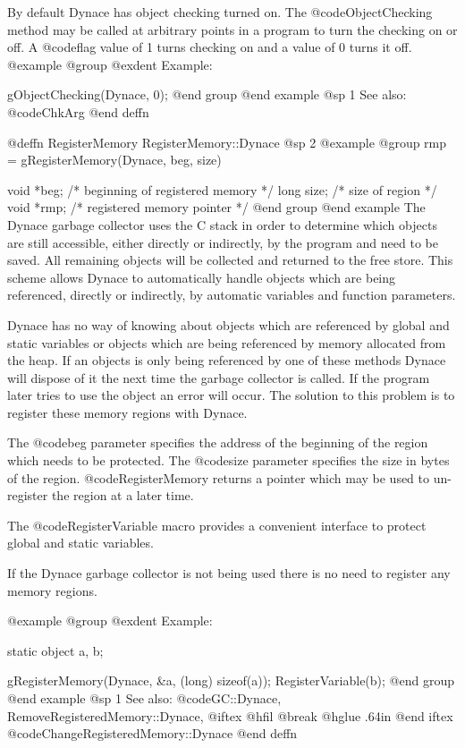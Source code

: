 By default Dynace has object checking turned on.  The @code{ObjectChecking}
method may be called at arbitrary points in a program to turn the checking
on or off.  A @code{flag} value of 1 turns checking on and a value of 0
turns it off.
@example
@group
@exdent Example:

gObjectChecking(Dynace, 0);
@end group
@end example
@sp 1
See also:  @code{ChkArg}
@end deffn





@deffn {RegisterMemory} RegisterMemory::Dynace
@sp 2
@example
@group
rmp = gRegisterMemory(Dynace, beg, size)

void    *beg;   /*  beginning of registered memory  */
long    size;   /*  size of region      */
void    *rmp;   /*  registered memory pointer  */
@end group
@end example
The Dynace garbage collector uses the C stack in order to determine which
objects are still accessible, either directly or indirectly, by the
program and need to be saved.  All remaining objects will be collected
and returned to the free store.  This scheme allows Dynace to automatically
handle objects which are being referenced, directly or indirectly, by
automatic variables and function parameters.

Dynace has no way of knowing about objects which are referenced by global
and static variables or objects which are being referenced by memory
allocated from the heap.  If an objects is only being referenced by
one of these methods Dynace will dispose of it the next time the
garbage collector is called.  If the program later tries to use the
object an error will occur.  The solution to this problem is to
register these memory regions with Dynace.

The @code{beg} parameter specifies the address of the beginning of the
region which needs to be protected.  The @code{size} parameter specifies
the size in bytes of the region.  @code{RegisterMemory} returns a pointer
which may be used to un-register the region at a later time.

The @code{RegisterVariable} macro provides a convenient interface
to protect global and static variables.

If the Dynace garbage collector is not being used there is no need to
register any memory regions.

@example
@group
@exdent Example:

static  object  a, b;

gRegisterMemory(Dynace, &a, (long) sizeof(a));
RegisterVariable(b);
@end group
@end example
@sp 1
See also:  @code{GC::Dynace, RemoveRegisteredMemory::Dynace,}
@iftex
@hfil @break @hglue .64in   
@end iftex
@code{ChangeRegisteredMemory::Dynace}
@end deffn






